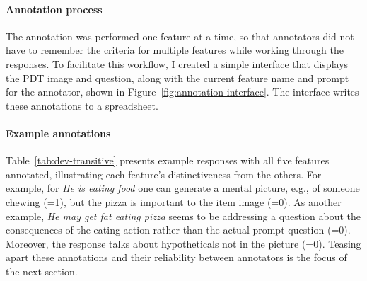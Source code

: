 \paragraph{Annotation process}
The annotation was performed one feature at a time, so that annotators did not have to remember the criteria for multiple features while working through the responses. To facilitate this workflow, I created a simple interface that displays the PDT image and question, along with the current feature name and prompt for the annotator, shown in Figure~\ref{fig:annotation-interface}. The interface writes these annotations to a spreadsheet.


\paragraph{Example annotations}

Table~\ref{tab:dev-transitive} presents example responses with all five features annotated, illustrating each feature's distinctiveness from the others.  For example, for \textit{He is eating food} one can generate a mental picture, e.g., of someone chewing (=1), but the pizza is important to the item image (=0).  As another example, \textit{He may get fat eating pizza} seems to be addressing a question about the consequences of the eating action rather than the actual prompt question (=0). Moreover, the response talks about hypotheticals not in the picture (=0).
Teasing apart these annotations and their reliability between annotators is the focus of the next section.

